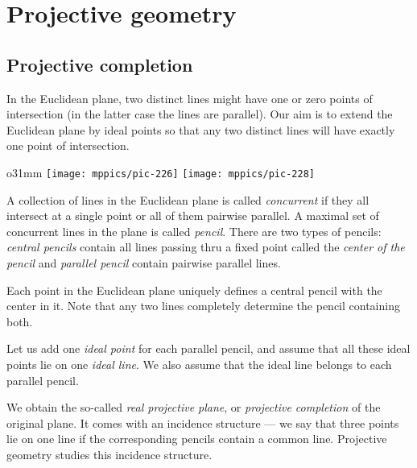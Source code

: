 \chapter{Projective geometry}\label{chap:proj}

\section*{Projective completion}

In the Euclidean plane, two distinct lines might have one or zero points of intersection 
(in the latter case the lines are parallel).
Our aim is to extend the Euclidean plane by ideal points so that any two distinct lines will have exactly one point of intersection.

\begin{wrapfigure}{o}{31mm}
\centering
\texttt{[image: mppics/pic-226]}
\vskip4mm
\texttt{[image: mppics/pic-228]}
\end{wrapfigure}

A collection of lines in the Euclidean plane is called \emph{concurrent} if they all intersect at a single point or all of them pairwise parallel.
A maximal set of concurrent lines in the plane is called \emph{pencil}.
There are two types of pencils: 
\emph{central pencils} contain all lines passing thru a fixed point called the \emph{center of the pencil}
and  
\emph{parallel pencil} contain pairwise parallel lines.

Each point in the Euclidean plane uniquely defines a central pencil with the center in it.
Note that any two lines completely determine the pencil containing both.

Let us add one \emph{ideal point} for each parallel pencil,
and assume that all these ideal points lie on one \emph{ideal line}.
We also assume that the ideal line belongs to each parallel pencil.

We obtain the so-called \emph{real projective plane}, or \emph{projective completion} of the original plane. 
It comes with an incidence structure --- we say that three points lie on one line if the corresponding pencils contain a common line.
Projective geometry studies this incidence structure.

